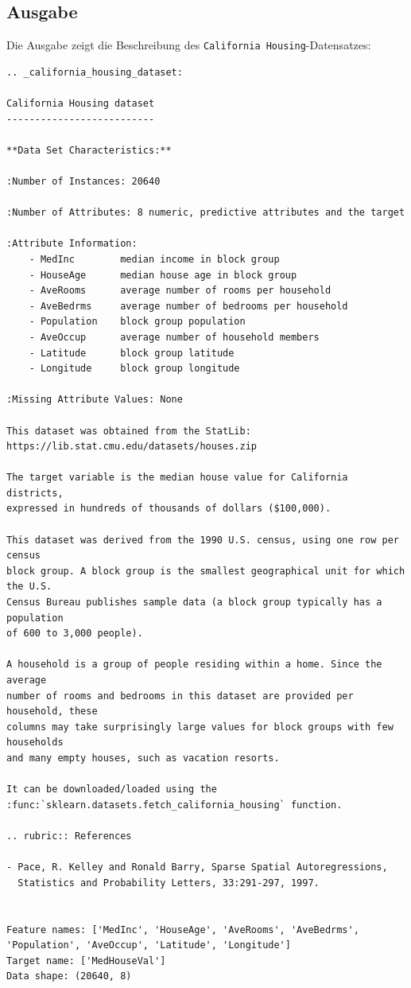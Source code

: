\subsection{Ausgabe}

Die Ausgabe zeigt die Beschreibung des \texttt{California Housing}-Datensatzes:

\begin{verbatim}
.. _california_housing_dataset:

California Housing dataset
--------------------------

**Data Set Characteristics:**

:Number of Instances: 20640

:Number of Attributes: 8 numeric, predictive attributes and the target

:Attribute Information:
    - MedInc        median income in block group
    - HouseAge      median house age in block group
    - AveRooms      average number of rooms per household
    - AveBedrms     average number of bedrooms per household
    - Population    block group population
    - AveOccup      average number of household members
    - Latitude      block group latitude
    - Longitude     block group longitude

:Missing Attribute Values: None

This dataset was obtained from the StatLib:
https://lib.stat.cmu.edu/datasets/houses.zip

The target variable is the median house value for California districts,
expressed in hundreds of thousands of dollars ($100,000).

This dataset was derived from the 1990 U.S. census, using one row per census
block group. A block group is the smallest geographical unit for which the U.S.
Census Bureau publishes sample data (a block group typically has a population
of 600 to 3,000 people).

A household is a group of people residing within a home. Since the average
number of rooms and bedrooms in this dataset are provided per household, these
columns may take surprisingly large values for block groups with few households
and many empty houses, such as vacation resorts.

It can be downloaded/loaded using the
:func:`sklearn.datasets.fetch_california_housing` function.

.. rubric:: References

- Pace, R. Kelley and Ronald Barry, Sparse Spatial Autoregressions,
  Statistics and Probability Letters, 33:291-297, 1997.


Feature names: ['MedInc', 'HouseAge', 'AveRooms', 'AveBedrms', 'Population', 'AveOccup', 'Latitude', 'Longitude']
Target name: ['MedHouseVal']
Data shape: (20640, 8)
\end{verbatim}

